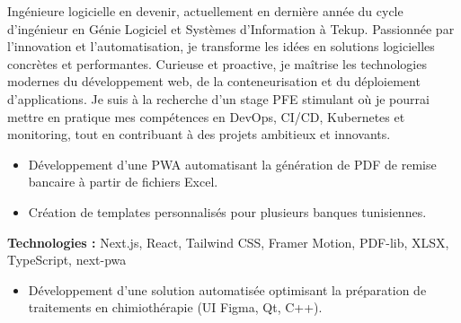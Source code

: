 \documentclass[10pt,a4paper]{altacv}
\begin{document}
\makecvheader

Ingénieure logicielle en devenir, actuellement en dernière année du cycle d'ingénieur en Génie Logiciel et Systèmes d'Information à Tekup.
Passionnée par l'innovation et l'automatisation, je transforme les idées en solutions logicielles concrètes et performantes.
Curieuse et proactive, je maîtrise les technologies modernes du développement web, de la conteneurisation et du déploiement d'applications.
Je suis à la recherche d'un stage PFE stimulant où je pourrai mettre en pratique mes compétences en DevOps, CI/CD, Kubernetes et monitoring, tout en contribuant à des projets ambitieux et innovants.




\begin{itemize}
  \item Développement d'une PWA automatisant la génération de PDF de remise bancaire à partir de fichiers Excel.
  \item Création de templates personnalisés pour plusieurs banques tunisiennes.
\end{itemize}
\textbf{Technologies :} Next.js, React, Tailwind CSS, Framer Motion, PDF-lib, XLSX, TypeScript, next-pwa

\vspace{1em}

\begin{itemize}
  \item Développement d'une solution automatisée optimisant la préparation de traitements en chimiothérapie (UI Figma, Qt, C++).
\end{itemize}
\end{document}

